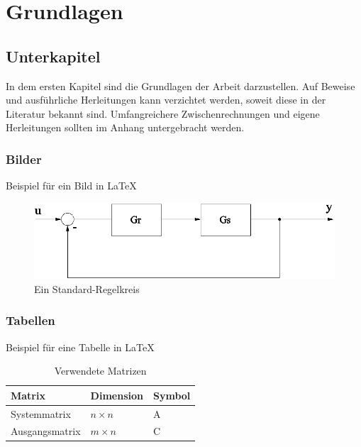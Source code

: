 
\chapter{Grundlagen}
\section{Unterkapitel}
In dem ersten Kapitel sind die Grundlagen der Arbeit darzustellen. Auf Beweise und ausführliche Herleitungen kann verzichtet werden, soweit diese in der Literatur bekannt sind.
Umfangreichere Zwischenrechnungen und eigene Herleitungen sollten im Anhang untergebracht werden.

\subsection{Bilder}
Beispiel für ein Bild in \LaTeX{}
\begin{figure}[ht]
	\begin{center}
		\includegraphics[scale=0.3]{bilder/regelkreis.png}
		\caption{Ein Standard-Regelkreis}
		\label{pic:grund:regelkreis}
	\end{center}
\end{figure}

\subsection{Tabellen}
Beispiel für eine Tabelle in \LaTeX{}
\begin{table}[ht]
	\begin{center}
		\caption{Verwendete Matrizen}
		\begin{tabular}{|l|l|l|}
			\hline
			Matrix& Dimension& Symbol\\
			\hline
			Systemmatrix& $n\times n$& \textrm{A}\\
			\hline
			Ausgangsmatrix& $m\times n$& \textrm{C}\\
			\hline
		\end{tabular}
		\label{tab:grund:matrizen}
	\end{center}
\end{table}

